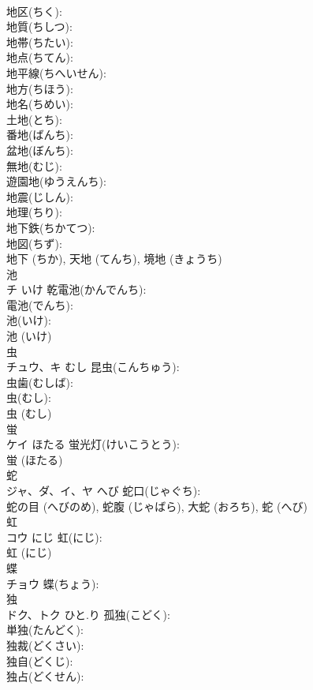 \documentclass[8pt]{extreport}
\begin{document}
\begin{CJK}{UTF8}{min}
\\	地区(ちく): 
\\	地質(ちしつ): 
\\	地帯(ちたい): 
\\	地点(ちてん): 
\\	地平線(ちへいせん): 
\\	地方(ちほう): 
\\	地名(ちめい): 
\\	土地(とち): 
\\	番地(ばんち): 
\\	盆地(ぼんち): 
\\	無地(むじ): 
\\	遊園地(ゆうえんち): 
\\	地震(じしん): 
\\	地理(ちり): 
\\	地下鉄(ちかてつ): 
\\	地図(ちず): 
\\	地下 (ちか), 天地 (てんち), 境地 (きょうち)
\\	池		
\\	チ	いけ	乾電池(かんでんち): 
\\	電池(でんち): 
\\	池(いけ): 
\\	池 (いけ)
\\	虫		
\\	チュウ、キ	むし	昆虫(こんちゅう): 
\\	虫歯(むしば): 
\\	虫(むし): 
\\	虫 (むし)
\\	蛍		
\\	ケイ	ほたる	蛍光灯(けいこうとう): 
\\	蛍 (ほたる)
\\	蛇		
\\	ジャ、ダ、イ、ヤ	へび	蛇口(じゃぐち): 
\\	蛇の目 (へびのめ), 蛇腹 (じゃばら), 大蛇 (おろち), 蛇 (へび)
\\	虹		
\\	コウ	にじ	虹(にじ): 
\\	虹 (にじ)
\\	蝶		
\\	チョウ		蝶(ちょう): 
\\	独		
\\	ドク、トク	ひと.り	孤独(こどく): 
\\	単独(たんどく): 
\\	独裁(どくさい): 
\\	独自(どくじ): 
\\	独占(どくせん): 

\end{CJK}
\end{document}
